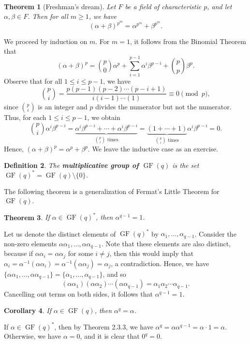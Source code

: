 \documentclass[10pt]{article}
\makeatletter
\DeclareMathOperator{\GF}{GF}
\theoremstyle{newstyle}
\newtheorem{thm}{Theorem}[subsection]
\newtheorem{cor}[thm]{Corollary}
\newtheorem{defn}[thm]{Definition}
\newenvironment{pf}[1][\proofname]{\par
  \pushQED{\qed}%
  \normalfont \topsep0\p@\relax
  \trivlist
  \item[\hskip\labelsep\scshape
  #1\@addpunct{.}]\ignorespaces
}{%
  \popQED\endtrivlist\@endpefalse
}
\makeatother
\begin{document}
\begin{thm}[Freshman's dream]
Let $F$ be a field of characteristic $p$, and let $\alpha, \beta \in F$. Then for all $m \geq 1$, 
we have 
\[ (\alpha+\beta)^{p^m} = \alpha^{p^m} + \beta^{p^m}. \]
\end{thm}
\begin{pf}
We proceed by induction on $m$. For $m = 1$, it follows from the Binomial Theorem that 
\[ (\alpha + \beta)^p = \binom{p}0 \alpha^p + \sum_{i=1}^{p-1} \alpha^i \beta^{p-i} + \binom{p}p \beta^p. \]
Observe that for all $1 \leq i \leq p-1$, we have 
\[ \binom{p}{i} = \frac{p(p-1)(p-2) \cdots (p-i+1)}{i(i-1) \cdots (1)} \equiv 0 \pmod p, \]
since $\binom{p}{i}$ is an integer and $p$ divides the numerator but not the numerator. 
Thus, for each $1 \leq i \leq p-1$, we obtain 
\[ \binom{p}{i} \alpha^i \beta^{p-i} = \underbrace{\alpha^i \beta^{p-i} + \cdots + 
\alpha^i \beta^{p-i}}_{\text{$\binom{p}i$ times}} = 
\underbrace{(1 + \cdots + 1)}_{\text{$\binom{p}i$ times}} \alpha^i \beta^{p-i} = 0. \]
Hence, $(\alpha + \beta)^p = \alpha^p + \beta^p$. We leave the inductive case as an exercise.
\end{pf}

\begin{defn}
The {\bf multiplicative group of $\GF(q)$} is the set $\GF(q)^* = \GF(q) \setminus \{0\}$.
\end{defn}

The following theorem is a generalization of Fermat's Little Theorem for $\GF(q)$. 

\begin{thm}
If $\alpha \in \GF(q)^*$, then $\alpha^{q-1} = 1$. 
\end{thm}
\begin{pf}
Let us denote the distinct elements of $\GF(q)^*$ by $\alpha_1, \dots, \alpha_{q-1}$. 
Consider the non-zero elements $\alpha\alpha_1, \dots, \alpha\alpha_{q-1}$. 
Note that these elements are also distinct, because if $\alpha\alpha_i = \alpha\alpha_j$ for 
some $i\neq j$, then this would imply that $\alpha_i = \alpha^{-1}(\alpha\alpha_i) 
= \alpha^{-1}(\alpha\alpha_j) = \alpha_j$, a contradiction. Hence, we have 
$\{\alpha\alpha_1, \dots, \alpha\alpha_{q-1}\} = \{\alpha_1, \dots, \alpha_{q-1}\}$, 
and so 
\[ (\alpha\alpha_1)(\alpha\alpha_2) \cdots (\alpha\alpha_{q-1}) = \alpha_1\alpha_2 \cdots 
\alpha_{q-1}. \]
Cancelling out terms on both sides, it follows that $\alpha^{q-1} = 1$.
\end{pf}

\begin{cor}
If $\alpha \in \GF(q)$, then $\alpha^q = \alpha$.
\end{cor}
\begin{pf}
If $\alpha \in \GF(q)^*$, then by Theorem 2.3.3, we have $\alpha^q = \alpha\alpha^{q-1} 
= \alpha \cdot 1 = \alpha$. Otherwise, we have $\alpha = 0$, and it is clear that 
$0^q = 0$.
\end{pf}
\end{document}
